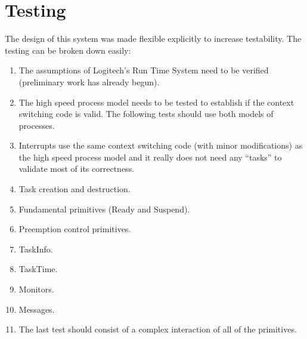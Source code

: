 \section{Testing}
The design of this system was made flexible explicitly to increase testability.
The testing can be broken down easily:
\begin{enumerate}
\item
    The assumptions of Logitech's Run Time System need to be verified
    (preliminary work has already begun).
\item
    The high speed process model needs to be tested to establish if the
    context switching code is valid.  The following tests should use both
    models of processes.
\item
    Interrupts use the same context switching code (with minor modifications)
    as the high speed process model and it really does not need any ``tasks''
    to validate most of its correctness.
\item
    Task creation and destruction.
\item
    Fundamental primitives (Ready and Suspend). 
\item
    Preemption control primitives.
\item
    TaskInfo.
\item
    TaskTime.
\item
    Monitors.
\item
    Messages.
\item
    The last test should consist of a complex interaction of all of 
    the primitives.  
\end{enumerate}


